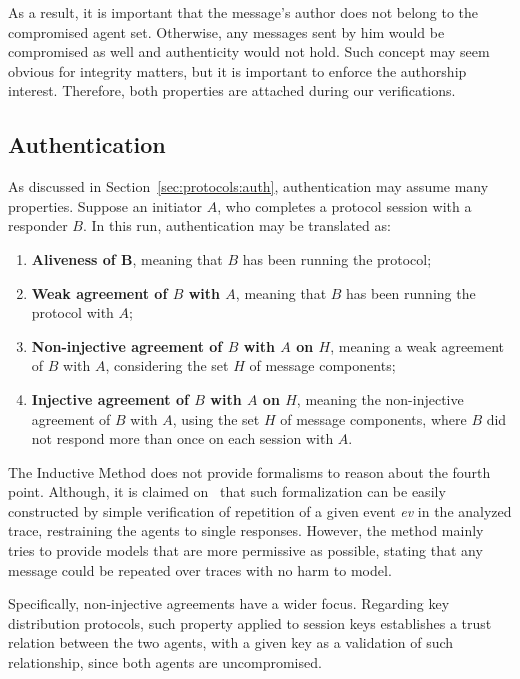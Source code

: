 As a result, it is important that the message's author does not belong to the compromised agent set. Otherwise, any messages sent by him would be compromised as well and authenticity would not hold. Such concept may seem obvious for integrity matters, but it is important to enforce the authorship interest. Therefore, both properties are attached during our verifications.



\subsection{Authentication}
As discussed in Section~\ref{sec:protocols:auth}, authentication may assume many properties. Suppose an initiator \(A\), who completes a protocol session with a responder \(B\). In this run, authentication may be translated as:

\begin{enumerate}
  \item \textbf{Aliveness of B}, meaning that \(B\) has been running the protocol;
  \item \textbf{Weak agreement of \(B\) with \(A\)}, meaning that \(B\) has been running the protocol with \(A\);
  \item \textbf{Non-injective agreement of \(B\) with \(A\) on \(H\)}, meaning a weak agreement of \(B\) with \(A\), considering the set \(H\) of message components;
  \item \textbf{Injective agreement of \(B\) with \(A\) on \(H\)}, meaning the non-injective agreement of \(B\) with \(A\), using the set \(H\) of message components, where \(B\) did not respond more than once on each session with \(A\).
\end{enumerate}

The Inductive Method does not provide formalisms to reason about the fourth point. Although, it is claimed on~\cite{Bella2007} that such formalization can be easily constructed by simple verification of repetition of a given event \textit{ev} in the analyzed trace, restraining the agents to single responses. However, the method mainly tries to provide models that are more permissive as possible, stating that any message could be repeated over traces with no harm to model.

Specifically, non-injective agreements have a wider focus. Regarding key distribution protocols, such property applied to session keys establishes a trust relation between the two agents, with a given key as a validation of such relationship, since both agents are uncompromised.


